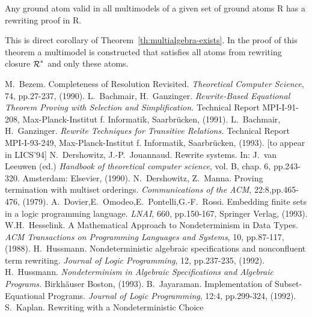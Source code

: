 \begin{COROLLARY} \label{co:rew-completeness}
Any ground atom valid in all multimodels of a given set of ground atoms \C R 
has a rewriting proof in \C R.
\end{COROLLARY}
\begin{PROOF}
This is direct corollary of Theorem~\ref {th:multialgebra-exists}. In the
proof of this theorem a multimodel is constructed that satisfies all atoms
from rewriting closure \(\mbox{$\cal R$}^\ast\) and only these atoms.  
\end{PROOF}



\begin{thebibliography}{MM99}
 M.~Bezem. 
   Completeness of Resolution Revisited. 
   {\em Theoretical Computer Science}, 74, pp.27-237, (1990).
 L.~Bachmair, H.~Ganzinger. 
   {\em Rewrite-Based Equational Theorem Proving with 
                           Selection and Simplification.}
   Technical Report MPI-I-91-208, Max-Planck-Institut f. Informatik, 
   Saarbr\"ucken, (1991).
 L.~Bachmair, H.~Ganzinger. 
   {\em Rewrite Techniques for Transitive Relations.}
   Technical Report MPI-I-93-249, Max-Planck-Institut f. Informatik, 
   Saarbr\"ucken, (1993). [to appear in LICS'94]
 N.~Dershowitz, J.-P.~Jouannaud. 
   Rewrite systems. In: J.~van Leeuwen (ed.) 
   {\em Handbook of theoretical computer science}, vol. B,
   chap. 6, pp.243-320. Amsterdam: Elsevier, (1990).
 N.~Dershowitz, Z.~Manna. 
   Proving termination with multiset orderings. 
   {\em Communications of the ACM}, 22:8,pp.465-476, (1979).
 A.~Dovier,E.~Omodeo,E.~Pontelli,G.-F.~Rossi. 
   Embedding finite sets in a logic programming language. 
   {\em LNAI}, 660, pp.150-167, Springer Verlag, (1993).
 W.H.~Hesselink. A Mathematical Approach to Nondeterminism
   in Data Types. {\em ACM Transactions on Programming Languages and Systems},
   10, pp.87-117, (1988).
 H.~Hussmann. Nondeterministic algebraic
   specifications and nonconfluent term rewriting. {\em Journal of Logic
   Programming}, 12, pp.237-235, (1992).
 H.~Hussmann. 
   {\em Nondeterminism in Algebraic Specifications and Algebraic Programs.}
   Birkh\"auser Boston, (1993).
 B.~Jayaraman. Implementation of Subset-Equational 
   Programs. {\em Journal of Logic Programming}, 12:4, pp.299-324, (1992).
 S.~Kaplan. Rewriting with a Nondeterministic Choice

\end{thebibliography}
